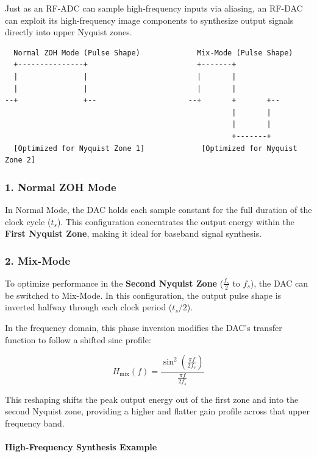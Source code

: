 \documentclass[
]{article}
\begin{document}
Just as an RF-ADC can sample high-frequency inputs via aliasing, an
RF-DAC can exploit its high-frequency image components to synthesize
output signals directly into upper Nyquist zones.

\begin{verbatim}
  Normal ZOH Mode (Pulse Shape)             Mix-Mode (Pulse Shape)
  +---------------+                         +-------+
  |               |                         |       |
  |               |                         |       |
--+               +--                     --+       +       +--
                                                    |       |
                                                    |       |
                                                    +-------+
  [Optimized for Nyquist Zone 1]             [Optimized for Nyquist Zone 2]
\end{verbatim}

\subsubsection{1. Normal ZOH Mode}\label{normal-zoh-mode}

In Normal Mode, the DAC holds each sample constant for the full duration
of the clock cycle (\(t_s\)). This configuration concentrates the output
energy within the \textbf{First Nyquist Zone}, making it ideal for
baseband signal synthesis.

\subsubsection{2. Mix-Mode}\label{mix-mode}

To optimize performance in the \textbf{Second Nyquist Zone}
(\(\frac{f_s}{2}\) to \(f_s\)), the DAC can be switched to Mix-Mode. In
this configuration, the output pulse shape is inverted halfway through
each clock period (\(t_s/2\)).

In the frequency domain, this phase inversion modifies the DAC's
transfer function to follow a shifted sinc profile:

\[H_{\text{mix}}(f) = \frac{\sin^2\left(\frac{\pi f}{2 f_s}\right)}{\frac{\pi f}{2 f_s}}\]

This reshaping shifts the peak output energy out of the first zone and
into the second Nyquist zone, providing a higher and flatter gain
profile across that upper frequency band.

\paragraph{High-Frequency Synthesis
Example}\label{high-frequency-synthesis-example}
\end{document}
